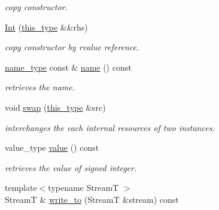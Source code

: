 \begin{DoxyCompactItemize}
\begin{DoxyCompactList}\small\item\em copy constructor. \end{DoxyCompactList}\item 
\hypertarget{classhryky_1_1reduction_1_1_int_abcf6b2bb8a2288a0e067fbcb57dd71bd}{\hyperlink{classhryky_1_1reduction_1_1_int_abcf6b2bb8a2288a0e067fbcb57dd71bd}{Int} (\hyperlink{classhryky_1_1reduction_1_1_base_af02a7dee6042080b7380afd2f9500a42}{this\-\_\-type} \&\&rhs)}\label{classhryky_1_1reduction_1_1_int_abcf6b2bb8a2288a0e067fbcb57dd71bd}

\begin{DoxyCompactList}\small\item\em copy constructor by rvalue reference. \end{DoxyCompactList}\item 
\hypertarget{classhryky_1_1reduction_1_1_base_a842569265d741905eb8a353d3935f1d1}{\hyperlink{namespacehryky_1_1reduction_ac686c30a4c8d196bbd0f05629a6b921f}{name\-\_\-type} const \& \hyperlink{classhryky_1_1reduction_1_1_base_a842569265d741905eb8a353d3935f1d1}{name} () const }\label{classhryky_1_1reduction_1_1_base_a842569265d741905eb8a353d3935f1d1}

\begin{DoxyCompactList}\small\item\em retrieves the name. \end{DoxyCompactList}\item 
\hypertarget{classhryky_1_1reduction_1_1_int_abcd3fd2ae9210b4bc746898210cbf83d}{void \hyperlink{classhryky_1_1reduction_1_1_int_abcd3fd2ae9210b4bc746898210cbf83d}{swap} (\hyperlink{classhryky_1_1reduction_1_1_base_af02a7dee6042080b7380afd2f9500a42}{this\-\_\-type} \&src)}\label{classhryky_1_1reduction_1_1_int_abcd3fd2ae9210b4bc746898210cbf83d}

\begin{DoxyCompactList}\small\item\em interchanges the each internal resources of two instances. \end{DoxyCompactList}\item 
value\-\_\-type \hyperlink{classhryky_1_1reduction_1_1_int_a093933195e424d24a1fc1deba79c7c3c}{value} () const 
\begin{DoxyCompactList}\small\item\em retrieves the value of signed integer. \end{DoxyCompactList}\item 
\hypertarget{classhryky_1_1reduction_1_1_base_a709cc7c48e1c90fe253739e46d82aa19}{{\footnotesize template$<$typename Stream\-T $>$ }\\Stream\-T \& \hyperlink{classhryky_1_1reduction_1_1_base_a709cc7c48e1c90fe253739e46d82aa19}{write\-\_\-to} (Stream\-T \&stream) const }\label{classhryky_1_1reduction_1_1_base_a709cc7c48e1c90fe253739e46d82aa19}


\end{DoxyCompactItemize}
